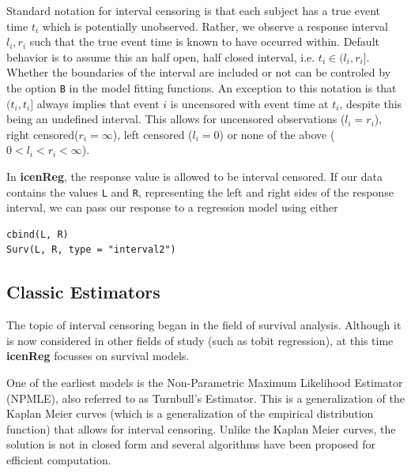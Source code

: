 \documentclass[a4paper]{article}
\begin{document}
Standard notation for interval censoring is that each subject has a true event time $t_i$ which is potentially unobserved. Rather, we observe a response interval $l_i,r_i$ such that the true event time is known to have occurred within. Default behavior is to assume this an half open, half closed interval, i.e. $t_i \in (l_i, r_i]$. Whether the boundaries of the interval are included or not can be controled by the option \texttt{B} in the model fitting functions. An exception to this notation is that $(t_i, t_i]$ always implies that event $i$ is uncensored with event time at $t_i$, despite this being an undefined interval. This allows for uncensored observations ($l_i = r_i$), right censored($r_i = \infty$), left censored ($l_i = 0$) or none of the above ($0 < l_i < r_i < \infty$). 
  
In {\bf icenReg}, the response value is allowed to be interval censored. If our data contains the values \texttt{L} and \texttt{R}, representing the left and right sides of the response interval, we can pass our response to a regression model using either
  
\begin{verbatim}
cbind(L, R)
Surv(L, R, type = "interval2")
\end{verbatim}
  

\subsection{Classic Estimators}
  
The topic of interval censoring began in the field of survival analysis. Although it is now considered in other fields of study (such as tobit regression), at this time {\bf{icenReg}} focusses on survival models. 

One of the earliest models is the Non-Parametric Maximum Likelihood Estimator (NPMLE), also referred to as Turnbull's Estimator. This is a generalization of the Kaplan Meier curves (which is a generalization of the empirical distribution function) that allows for interval censoring. Unlike the Kaplan Meier curves, the solution is not in closed form and several algorithms have been proposed for efficient computation. 

  
\end{document}
